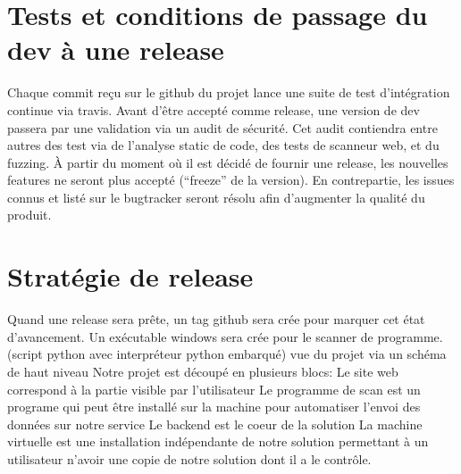 \section{Tests et conditions de passage du dev à une release}
Chaque commit reçu sur le github du projet lance une suite de test d’intégration continue via travis.
Avant d’être accepté comme release, une version de dev passera par une validation via un audit de sécurité. Cet audit contiendra entre autres des test via de l’analyse static de code, des tests de scanneur web, et du fuzzing.
À partir du moment où il est décidé de fournir une release, les nouvelles features ne seront plus accepté (“freeze” de la version). En contrepartie, les issues connus et listé sur le bugtracker seront résolu afin d'augmenter la qualité du produit.
\section{Stratégie de release}
Quand une release sera prête, un tag github sera crée pour marquer cet état d’avancement.
Un exécutable windows sera crée pour le scanner de programme. (script python avec interpréteur python embarqué)
vue du projet via un schéma de haut niveau
Notre projet est découpé en plusieurs blocs:
Le site web correspond à la partie visible par l’utilisateur
Le programme de scan est un programe qui peut être installé sur la machine pour automatiser l'envoi des données sur notre service
Le backend est le coeur de la solution
La machine virtuelle est une installation indépendante de notre solution permettant à un utilisateur n’avoir une copie de notre solution dont il a le contrôle.